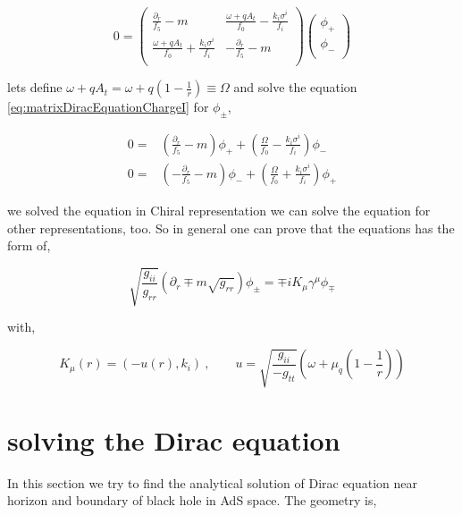 \begin{equation} \label{eq:matrixDiracEquationChargeI}
   0 = \begin{pmatrix} \frac{\partial_r}{f_5} - m & \frac{\omega + qA_t}{f_0} - \frac{k_i\sigma^i}{f_i} \\ \frac{\omega + qA_t}{f_0} + \frac{k_i\sigma^i}{f_i} & -\frac{\partial_r}{f_5} - m \\ \end{pmatrix} \begin{pmatrix} \phi_{+} \\ \phi_{-} \\ \end{pmatrix}
\end{equation}

lets define $\omega + qA_t = \omega + q(1-\frac{1}{r}) \equiv \Omega$ and solve the equation \ref{eq:matrixDiracEquationChargeI} for $\phi_{\pm}$,

\begin{align}
    0 =& \left( \frac{\partial_r}{f_5} - m \right) \phi_{+} + \left( \frac{\Omega}{f_0} - \frac{k_i\sigma^i}{f_i} \right) \phi_{-} \nonumber\\
    0 =& \left( - \frac{\partial_r}{f_5} - m \right) \phi_{-} + \left( \frac{\Omega}{f_0} + \frac{k_i\sigma^i}{f_i} \right) \phi_{+}
\end{align}

we solved the equation in Chiral representation we can solve the equation for other representations, too. So in general one can prove that the equations has the form of,

\begin{equation}
   \sqrt{\frac{g_{ii}}{g_{rr}}} \left(\partial_r\mp m\sqrt{g_{rr}} \right) \phi_{\pm} = \mp i K_{\mu}\gamma^{\mu}\phi_{\mp}
\end{equation}

with,

\begin{equation}
   K_{\mu}(r) = (-u(r),k_i)~, \qquad u = \sqrt{\frac{g_{ii}}{-g_{tt}}}\left(\omega + \mu_q(1-\frac{1}{r})\right)
\end{equation}

\section{solving the Dirac equation}

In this section we try to find the analytical solution of Dirac equation near horizon and boundary of black hole in AdS space. The geometry is,

